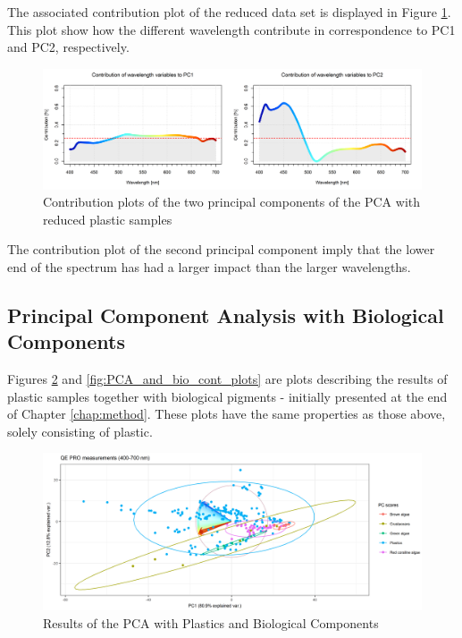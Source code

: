 \\\\
\noindent
The associated contribution plot of the reduced data set is displayed in Figure \ref{fig:PCA_plastics_doub_cont}. This plot show how the different wavelength contribute in correspondence to PC1 and PC2, respectively.

\begin{figure}[H]
    \centering
    \includegraphics[width=1\textwidth]{Images/results/PCA_plastics_reduced_doub_cont.png}
    \caption{Contribution plots of the two principal components of the PCA with reduced plastic samples}
    \label{fig:PCA_plastics_doub_cont}
\end{figure}
\noindent
The contribution plot of the second principal component imply that the lower end of the spectrum has had a larger impact than the larger wavelengths.

\subsection{Principal Component Analysis with Biological Components}
Figures \ref{fig:PCA_plastics_and_biology_scat} and \ref{fig:PCA_and_bio_cont_plots} are plots describing the results of plastic samples together with biological pigments - initially presented at the end of Chapter \ref{chap:method}. These plots have the same properties as those above, solely consisting of plastic.

\begin{figure}[H]
    \centering
    \includegraphics[width=1\textwidth]{Images/results/PCA_plastics_and_biology_scat_clust.png}
    \caption{Results of the PCA with Plastics and Biological Components}
    \label{fig:PCA_plastics_and_biology_scat}
\end{figure}


